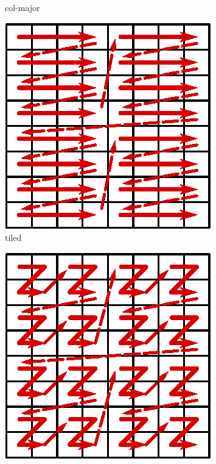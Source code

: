 \begin{figure}[h]
\begin{subfigure}{.15\textwidth}
      \caption{col-major}
      \label{fig:layout-col}
  \end{subfigure} 
  \begin{subfigure}{.15\textwidth}
      \centering
      \includegraphics[width=.9\linewidth]{img/matrix-tiled}
      \caption{tiled}
      \label{fig:layout-tile}
  \end{subfigure}
  \begin{subfigure}{.15\textwidth}
      \centering
      \includegraphics[width=.9\linewidth]{img/matrix-zcurve}

\end{subfigure}
\end{figure}
